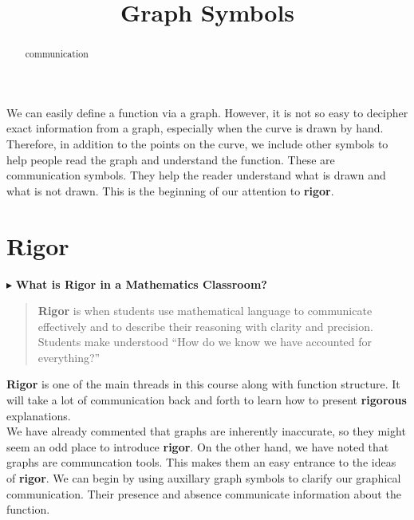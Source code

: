\documentclass{ximera}
\title{Graph Symbols}
\begin{document}
\begin{abstract}
communication
\end{abstract}
\maketitle



We can easily define a function via a graph.  However, it is not so easy to decipher exact information from a graph, especially when the curve is drawn by hand.  Therefore, in addition to the points on the curve, we include other symbols to help people read the graph and understand the function.  These are communication symbols.  They help the reader understand what is drawn and what is not drawn.  This is the beginning of our attention to \textbf{\textcolor{purple!85!blue}{rigor}}.



\section{Rigor}

$\blacktriangleright$ \textbf{\textcolor{purple!85!blue}{What is Rigor in a Mathematics Classroom?}} \\


\begin{quote}
\textbf{\textcolor{purple!85!blue}{Rigor}} is when students use mathematical language to communicate effectively and to describe their reasoning with clarity and precision.  Students make understood ``How do we know we have accounted for everything?''
\end{quote}



\textbf{\textcolor{blue!55!black}{Rigor}} is one of the main threads in this course along with function structure.  It will take a lot of communication back and forth to learn how to present \textbf{\textcolor{purple!85!blue}{rigorous}} explanations. \\


We have already commented that graphs are inherently inaccurate, so they might seem an odd place to introduce \textbf{\textcolor{purple!85!blue}{rigor}}.  On the other hand, we have noted that graphs are communcation tools. This makes them an easy entrance to the ideas of \textbf{\textcolor{purple!85!blue}{rigor}}.  We can begin by using auxillary graph symbols to clarify our graphical communication. Their presence and absence communicate information about the function.
\end{document}
